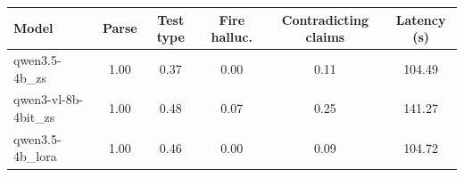 \begin{tabular}{lccccc}
\toprule
Model & Parse & Test type & Fire halluc. & Contradicting claims & Latency (s) \\
\midrule
qwen3.5-4b\_zs & 1.00 & 0.37 & 0.00 & 0.11 & 104.49 \\
qwen3-vl-8b-4bit\_zs & 1.00 & 0.48 & 0.07 & 0.25 & 141.27 \\
qwen3.5-4b\_lora & 1.00 & 0.46 & 0.00 & 0.09 & 104.72 \\
\bottomrule
\end{tabular}
